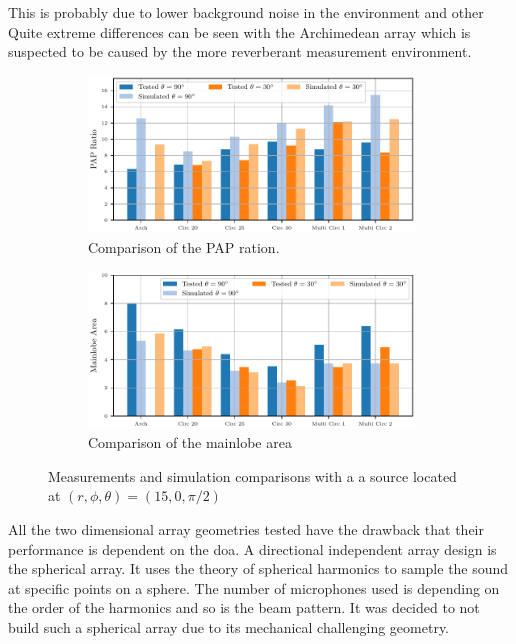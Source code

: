 This is probably due to lower background noise in the environment and other 
Quite extreme differences can be seen with the Archimedean array which is 
suspected to be caused by the more reverberant measurement environment.
\begin{figure}[h]
	\centering
	\begin{subfigure}[b]{1\textwidth}
		\centering
		\includegraphics[width=0.95\textwidth]{images/5_array_evaluation/PapTestSim.pdf}
		\caption{Comparison of the PAP ration.}
		\label{fig:comp1}
	\end{subfigure}
	\begin{subfigure}[b]{1\textwidth}
		\centering
		\includegraphics[width=0.95\textwidth]{images/5_array_evaluation/AreaTestSim.pdf}
		\caption{Comparison of the mainlobe area}
		\label{fig:comp2}
	\end{subfigure}
	\caption{Measurements and simulation comparisons with a a source located at $(r, \phi, \theta) = (15, 0, \pi/2)$}
	\label{fig:TestSim}
\end{figure}

All the two dimensional array geometries tested have the drawback
that their performance is dependent on the \acrshort*{doa}.
A directional independent array design is the spherical array. \cite{keylist}
It uses the theory of spherical harmonics to sample the sound at specific points
on a sphere.
The number of microphones used is depending on the order of the harmonics and so 
is the beam pattern.
It was decided to not build such a spherical array due to its mechanical 
challenging geometry.

